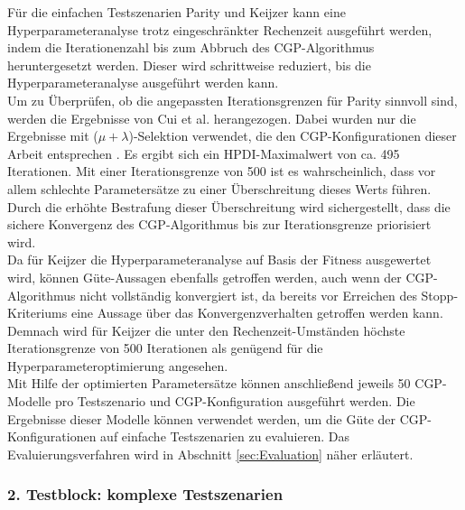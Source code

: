 Für die einfachen Testszenarien Parity und Keijzer kann eine Hyperparameteranalyse trotz eingeschränkter Rechenzeit ausgeführt werden, indem die Iterationenzahl bis zum Abbruch des CGP-Algorithmus heruntergesetzt werden.
Dieser wird schrittweise reduziert, bis die Hyperparameteranalyse ausgeführt werden kann.\\
Um zu Überprüfen, ob die angepassten Iterationsgrenzen für Parity sinnvoll sind, werden die Ergebnisse von Cui et al. herangezogen. 
Dabei wurden nur die Ergebnisse mit ($\mu + \lambda$)-Selektion verwendet, die den CGP-Konfigurationen dieser Arbeit entsprechen \cite{cui_results}.
Es ergibt sich ein HPDI-Maximalwert von ca. 495 Iterationen. 
Mit einer Iterationsgrenze von 500 ist es wahrscheinlich, dass vor allem schlechte Parametersätze zu einer Überschreitung dieses Werts führen.
Durch die erhöhte Bestrafung dieser Überschreitung wird sichergestellt, dass die sichere Konvergenz des CGP-Algorithmus bis zur Iterationsgrenze priorisiert wird.\\
Da für Keijzer die Hyperparameteranalyse auf Basis der Fitness ausgewertet wird, können Güte-Aussagen ebenfalls getroffen werden, auch wenn der CGP-Algorithmus nicht vollständig konvergiert ist, da bereits vor Erreichen des Stopp-Kriteriums eine Aussage über das Konvergenzverhalten getroffen werden kann.
Demnach wird für Keijzer die unter den Rechenzeit-Umständen höchste Iterationsgrenze von 500 Iterationen als genügend für die Hyperparameteroptimierung angesehen.\\

Mit Hilfe der optimierten Parametersätze können anschließend jeweils 50 CGP-Modelle pro Testszenario und CGP-Konfiguration ausgeführt werden.
Die Ergebnisse dieser Modelle können verwendet werden, um die Güte der CGP-Konfigurationen auf einfache Testszenarien zu evaluieren.
Das Evaluierungsverfahren wird in Abschnitt \ref{sec:Evaluation} näher erläutert.

\subsubsection{2. Testblock: komplexe Testszenarien}
\label{subsub:zweiterTestblock}

